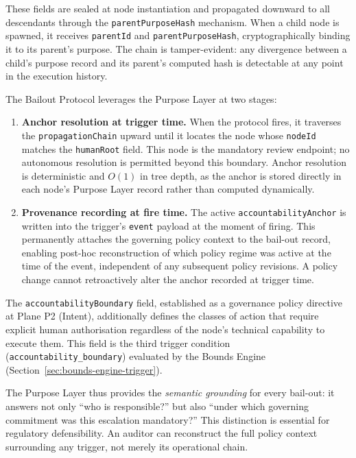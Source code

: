 \documentclass[12pt]{article}
\begin{document}
These fields are sealed at node instantiation and propagated downward to all descendants through the \texttt{parentPurposeHash} mechanism. When a child node is spawned, it receives \texttt{parentId} and \texttt{parentPurposeHash}, cryptographically binding it to its parent's purpose. The chain is tamper-evident: any divergence between a child's purpose record and its parent's computed hash is detectable at any point in the execution history.

The Bailout Protocol leverages the Purpose Layer at two stages:

\begin{enumerate}
  \item \textbf{Anchor resolution at trigger time.} When the protocol fires, it traverses the \texttt{propagationChain} upward until it locates the node whose \texttt{nodeId} matches the \texttt{humanRoot} field. This node is the mandatory review endpoint; no autonomous resolution is permitted beyond this boundary. Anchor resolution is deterministic and $O(1)$ in tree depth, as the anchor is stored directly in each node's Purpose Layer record rather than computed dynamically.
  \item \textbf{Provenance recording at fire time.} The active \texttt{accountabilityAnchor} is written into the trigger's \texttt{event} payload at the moment of firing. This permanently attaches the governing policy context to the bail-out record, enabling post-hoc reconstruction of which policy regime was active at the time of the event, independent of any subsequent policy revisions. A policy change cannot retroactively alter the anchor recorded at trigger time.
\end{enumerate}

The \texttt{accountabilityBoundary} field, established as a governance policy directive at Plane P2 (Intent), additionally defines the classes of action that require explicit human authorisation regardless of the node's technical capability to execute them. This field is the third trigger condition (\texttt{accountability\_boundary}) evaluated by the Bounds Engine (Section~\ref{sec:bounds-engine-trigger}).

The Purpose Layer thus provides the \emph{semantic grounding} for every bail-out: it answers not only ``who is responsible?'' but also ``under which governing commitment was this escalation mandatory?'' This distinction is essential for regulatory defensibility. An auditor can reconstruct the full policy context surrounding any trigger, not merely its operational chain.
\end{document}

